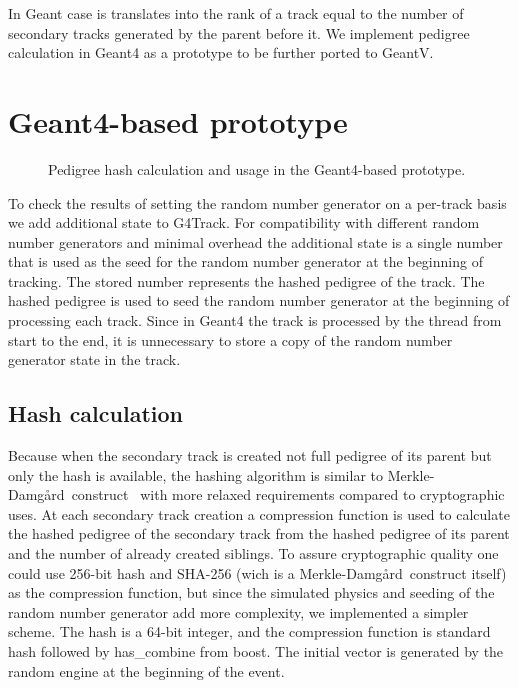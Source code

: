 \documentclass[a4paper, 12pt]{article} %
\newcommand{\MD}{Merkle-Damg\r{a}rd}
\begin{document}
   In Geant case is translates into the rank of a track equal to the number of secondary tracks generated by the parent before it.
   We implement pedigree calculation in Geant4 as a prototype to be further ported to GeantV.
   
  
 \section{Geant4-based prototype}
  \begin{figure}
   \scalebox{.5}{}
   \caption{Pedigree hash calculation and usage in the Geant4-based prototype.}
  \end{figure}
  To check the results of setting the random number generator on a per-track basis we add additional state to G4Track.
  For compatibility with different random number generators and minimal overhead the additional state is a single number that is used as the seed for the random number generator at the beginning of tracking.
  The stored number represents the hashed pedigree of the track.
  The hashed pedigree is used to seed the random number generator at the beginning of processing each track.
  Since in Geant4 the track is processed by the thread from start to the end, it is unnecessary to store a copy of the random number generator state in the track.
 
  \subsection{Hash calculation}
   Because when the secondary track is created not full pedigree of its parent but only the hash is available, the hashing algorithm is similar to \MD\ construct~\cite{Damgard1990, Merkle1990} with more relaxed requirements compared to cryptographic uses.
   At each secondary track creation a compression function is used to calculate the hashed pedigree of the secondary track from the hashed pedigree of its parent and the number of already created siblings.
   To assure cryptographic quality one could use 256-bit hash and SHA-256 (wich is a \MD\ construct itself) as the compression function, but since the simulated physics and seeding of the random number generator add more complexity, we implemented a simpler scheme.
   The hash is a 64-bit integer, and the compression function is standard hash followed by has\_combine from boost.
   The initial vector is generated by the random engine at the beginning of the event.
 
\end{document}
